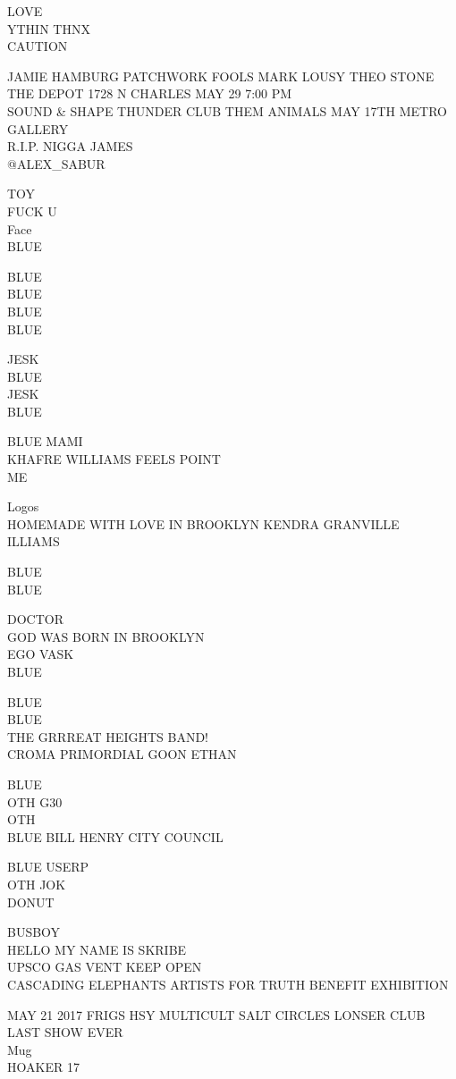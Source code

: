 \documentclass[10pt,letterpaper]{article}
\begin{document}
LOVE\\
YTHIN THNX\\
CAUTION

JAMIE HAMBURG PATCHWORK FOOLS MARK LOUSY THEO STONE THE DEPOT 1728 N CHARLES MAY 29 7:00 PM\\
SOUND \& SHAPE THUNDER CLUB THEM ANIMALS MAY 17TH METRO GALLERY\\
R.I.P. NIGGA JAMES\\
@ALEX\_SABUR

TOY\\
FUCK U\\
Face\\
BLUE

BLUE\\
BLUE\\
BLUE\\
BLUE

JESK\\
BLUE\\
JESK\\
BLUE

BLUE MAMI\\
KHAFRE WILLIAMS FEELS POINT\\
ME

Logos\\
HOMEMADE WITH LOVE IN BROOKLYN KENDRA GRANVILLE\\
ILLIAMS

BLUE\\
BLUE

DOCTOR\\
GOD WAS BORN IN BROOKLYN\\
EGO VASK\\
BLUE

BLUE\\
BLUE\\
THE GRRREAT HEIGHTS BAND!\\
CROMA PRIMORDIAL GOON ETHAN

BLUE\\
OTH G30\\
OTH\\
BLUE BILL HENRY CITY COUNCIL

BLUE USERP\\
OTH JOK\\
DONUT

BUSBOY\\
HELLO MY NAME IS SKRIBE\\
UPSCO GAS VENT KEEP OPEN\\
CASCADING ELEPHANTS ARTISTS FOR TRUTH BENEFIT EXHIBITION

MAY 21 2017 FRIGS HSY MULTICULT SALT CIRCLES LONSER CLUB LAST SHOW EVER\\
Mug\\
HOAKER 17
\end{document}
